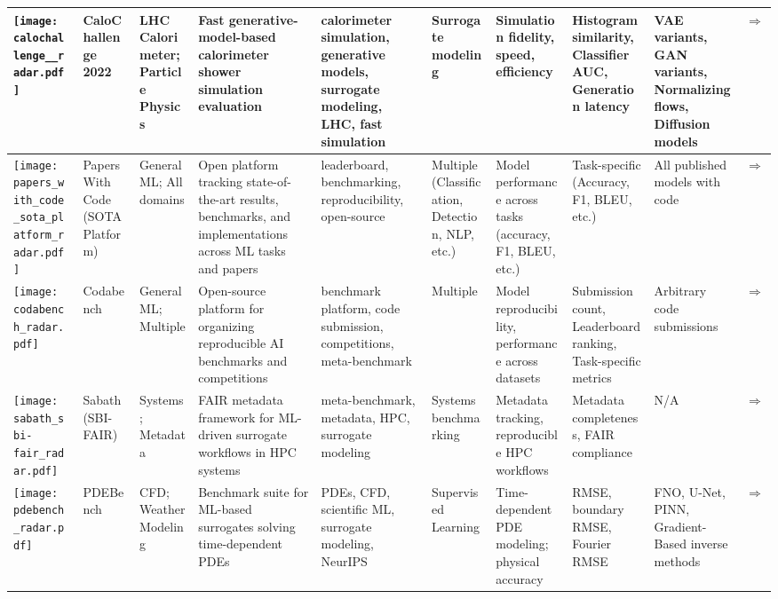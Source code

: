 \begin{landscape}
{\begin{longtable}{|p{}|p{}|p{}|p{}|p{}|p{}|p{}|p{}|p{}|p{}|}
\texttt{[image: calochallenge\_\_radar.pdf]} & CaloChallenge 2022 & LHC Calorimeter; Particle Physics & Fast generative-model-based calorimeter shower simulation evaluation & calorimeter simulation, generative models, surrogate modeling, LHC, fast simulation & Surrogate modeling & Simulation fidelity, speed, efficiency & Histogram similarity, Classifier AUC, Generation latency & VAE variants, GAN variants, Normalizing flows, Diffusion models & \cite{krause2024calochallenge2022communitychallenge}\href{http://arxiv.org/abs/2410.21611}{$\Rightarrow$} \\ \hline
\texttt{[image: papers\_with\_code\_sota\_platform\_radar.pdf]} & Papers With Code (SOTA Platform) & General ML; All domains & Open platform tracking state-of-the-art results, benchmarks, and implementations across ML tasks and papers & leaderboard, benchmarking, reproducibility, open-source & Multiple (Classification, Detection, NLP, etc.) & Model performance across tasks (accuracy, F1, BLEU, etc.) & Task-specific (Accuracy, F1, BLEU, etc.) & All published models with code & \cite{pmlr-v37-blum15}\href{https://paperswithcode.com/sota}{$\Rightarrow$} \\ \hline
\texttt{[image: codabench\_radar.pdf]} & Codabench & General ML; Multiple & Open-source platform for organizing reproducible AI benchmarks and competitions & benchmark platform, code submission, competitions, meta-benchmark & Multiple & Model reproducibility, performance across datasets & Submission count, Leaderboard ranking, Task-specific metrics & Arbitrary code submissions & \cite{xu-2022}\href{https://www.codabench.org/}{$\Rightarrow$} \\ \hline
\texttt{[image: sabath\_sbi-fair\_radar.pdf]} & Sabath (SBI-FAIR) & Systems; Metadata & FAIR metadata framework for ML-driven surrogate workflows in HPC systems & meta-benchmark, metadata, HPC, surrogate modeling & Systems benchmarking & Metadata tracking, reproducible HPC workflows & Metadata completeness, FAIR compliance & N/A & \cite{luszczek2021sabath}\href{https://sbi-fair.github.io/docs/software/sabath/}{$\Rightarrow$} \\ \hline
\texttt{[image: pdebench\_radar.pdf]} & PDEBench & CFD; Weather Modeling & Benchmark suite for ML-based surrogates solving time-dependent PDEs & PDEs, CFD, scientific ML, surrogate modeling, NeurIPS & Supervised Learning & Time-dependent PDE modeling; physical accuracy & RMSE, boundary RMSE, Fourier RMSE & FNO, U-Net, PINN, Gradient-Based inverse methods & \cite{takamoto2024pdebenchextensivebenchmarkscientific}\href{https://github.com/pdebench/PDEBench}{$\Rightarrow$} \\ \hline

\end{longtable}}
\end{landscape}
